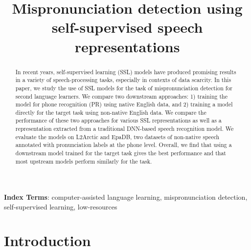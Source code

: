 \documentclass{INTERSPEECH2023}
\title{Mispronunciation detection using self-supervised speech representations}
\begin{document}
\maketitle


\begin{abstract}
In recent years, self-supervised learning (SSL) models have produced promising results in a variety of speech-processing tasks, especially in contexts of data scarcity. In this paper, we study the use of SSL models for the task of mispronunciation detection for second language learners. We compare two downstream approaches: 1) training the model for phone recognition (PR) using native English data, and 2) training a model directly for the target task using non-native English data. We compare the performance of these two approaches for various SSL representations as well as a representation extracted from a traditional DNN-based speech recognition model. We evaluate the models on L2Arctic and EpaDB, two datasets of non-native speech annotated with pronunciation labels at the phone level. Overall, we find that using a downstream model trained for the target task gives the best performance and that most upstream models perform similarly for the task. 

\end{abstract}
\noindent\textbf{Index Terms}: computer-assisted language learning, mispronunciation detection, self-supervised learning, low-resources

\section{Introduction}
\label{sec:intro}
\end{document}
